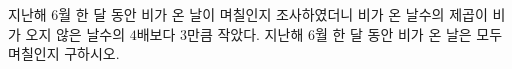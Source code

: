 지난해 $6$월 한 달 동안 비가 온 날이 며칠인지 조사하였더니 비가 온 날수의 제곱이 비가 오지 않은 날수의 $4$배보다 $3$만큼 작았다. 지난해 $6$월 한 달 동안 비가 온 날은 모두 며칠인지 구하시오. 
